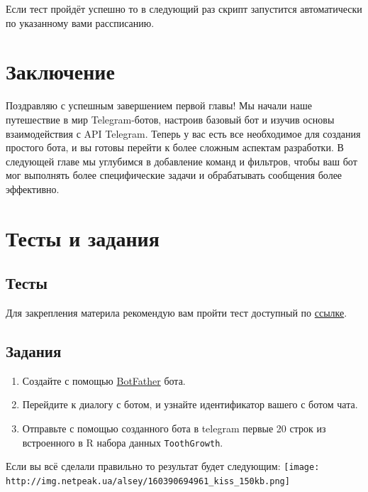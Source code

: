 \documentclass[
]{book}
\providecommand{\tightlist}{%
  \setlength{\itemsep}{0pt}\setlength{\parskip}{0pt}}
\begin{document}
Если тест пройдёт успешно то в следующий раз скрипт запустится автоматически по указанному вами рассписанию.

\section{Заключение}\label{ux437ux430ux43aux43bux44eux447ux435ux43dux438ux435}

Поздравляю с успешным завершением первой главы! Мы начали наше путешествие в мир Telegram-ботов, настроив базовый бот и изучив основы взаимодействия с API Telegram. Теперь у вас есть все необходимое для создания простого бота, и вы готовы перейти к более сложным аспектам разработки. В следующей главе мы углубимся в добавление команд и фильтров, чтобы ваш бот мог выполнять более специфические задачи и обрабатывать сообщения более эффективно.

\section{Тесты и задания}\label{ux442ux435ux441ux442ux44b-ux438-ux437ux430ux434ux430ux43dux438ux44f}

\subsection{Тесты}\label{ux442ux435ux441ux442ux44b}

Для закрепления материла рекомендую вам пройти тест доступный по \href{https://onlinetestpad.com/t/build-tg-bot-in-r-1}{ссылке}.

\subsection{Задания}\label{ux437ux430ux434ux430ux43dux438ux44f}

\begin{enumerate}
\def\labelenumi{\arabic{enumi}.}
\tightlist
\item
  Создайте с помощью \href{http://t.me/BotFather}{BotFather} бота.
\item
  Перейдите к диалогу с ботом, и узнайте идентификатор вашего с ботом чата.
\item
  Отправьте с помощью созданного бота в telegram первые 20 строк из встроенного в R набора данных \texttt{ToothGrowth}.
\end{enumerate}

Если вы всё сделали правильно то результат будет следующим:
\texttt{[image: http://img.netpeak.ua/alsey/160390694961\_kiss\_150kb.png]}
\end{document}
